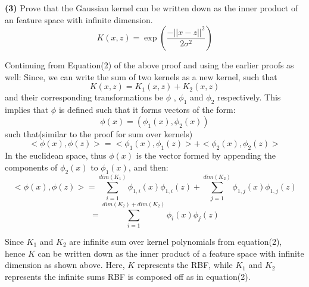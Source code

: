 \documentclass{article}
\renewcommand\part[1]{\vspace{.10in}\textbf{(#1)}}
\begin{document}
    \part{3} Prove that the Gaussian kernel can be written down as the inner product of an feature space with infinite dimension. 
    \[K(x,z) = \exp(\dfrac{-||x-z||^2}{2{\sigma}^2})\]

    Continuing from Equation(2) of the above proof and using the earlier proofs as well: \newline
    Since, we can write the sum of two kernels as a new kernel, such that
    \[K(x,z) = K_1(x,z) + K_2(x,z)\]
    and their corresponding transformations be $\phi$ , $\phi_1$ and $\phi_2$ respectively. This implies that $\phi$ is defined such that it forms vectors of the form:
    \[ \phi(x) = (\phi_1(x), \phi_2(x))\]
    such that(similar to the proof for sum over kernels)
   \[ <\phi(x),\phi(z)> = <\phi_1(x), \phi_1(z)> + <\phi_2(x), \phi_2(z)>\]
   In the euclidean space, thus $\phi(x)$ is the vector formed by appending the components of $\phi_2(x)$ to $\phi_1(x)$, and then:
   \[<\phi(x), \phi(z)> = \sum_{i=1}^{dim(K_1)} \phi_{1,i}(x)\phi_{1,i}(z) + \sum_{j=1}^{dim(K_2)} \phi_{1,j}(x)\phi_{1,j}(z)\]
   \[ = \sum_{i=1}^{dim(K_2)+dim(K_2)} \phi_{i}(x)\phi_{j}(z)\]

   Since $K_1$ and $K_2$ are infinite sum over kernel polynomials from equation(2), hence $K$ can be written down as the inner product of a feature space with infinite dimension as shown above. Here, $K$ represents the RBF, while $K_1$ and $K_2$ represents the infinite sums RBF is composed off as in equation(2). \newline
\end{document}
